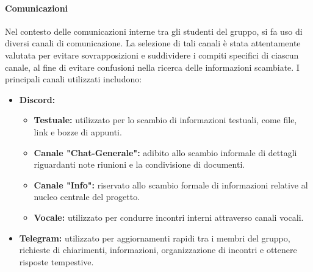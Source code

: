 \documentclass{article}
\begin{document}
\paragraph{Comunicazioni}
Nel contesto delle comunicazioni interne tra gli studenti del gruppo, si fa uso di diversi canali di comunicazione. La selezione di tali canali è stata attentamente valutata per evitare sovrapposizioni e suddividere i compiti specifici di ciascun canale, al fine di evitare confusioni nella ricerca delle informazioni scambiate. I principali canali utilizzati includono:
\begin{itemize}
    \item \textbf{Discord:}
        \begin{itemize}
            \item \textbf{Testuale:} utilizzato per lo scambio di informazioni testuali, come file, link e bozze di appunti.
            \item \textbf{Canale "Chat-Generale":} adibito allo scambio informale di dettagli riguardanti note riunioni e la condivisione di documenti.
            \item \textbf{Canale "Info":} riservato allo scambio formale di informazioni relative al nucleo centrale del progetto.
            \item \textbf{Vocale:} utilizzato per condurre incontri interni attraverso canali vocali.
        \end{itemize}
    \item \textbf{Telegram:} utilizzato per aggiornamenti rapidi tra i membri del gruppo, richieste di chiarimenti, informazioni, organizzazione di incontri e ottenere risposte tempestive.

\end{itemize}
\end{document}
